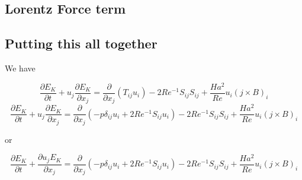 \documentclass[11pt]{article}
\newcommand{\PD}{\partial}
\begin{document}
\subsection{Lorentz Force term}

\subsection{Putting this all together}
We have

\begin{equation}
	\frac{\PD E_K}{\PD t}
	+
	u_j \frac{\PD E_K}{\PD x_j}
	= 
	\frac{\PD}{\PD x_j} (T_{ij} u_i)
	-
	2 Re^{-1} S_{ij} S_{ij}
	+
	\frac{Ha^2}{Re}
	u_i
	(j \times B)_i
\end{equation}
\begin{equation}
	\boxed{
	\frac{\PD E_K}{\PD t}
	+
	u_j \frac{\PD E_K}{\PD x_j}
	= 
	\frac{\PD}{\PD x_j} 
	(
	-p \delta_{ij}
	u_i
	+
	2 Re^{-1}
	S_{ij}
	u_i
	)
	-
	2 Re^{-1} S_{ij} S_{ij}
	+
	\frac{Ha^2}{Re}
	u_i
	(j \times B)_i
	}
\end{equation}

or

\begin{equation}
	\boxed{
	\frac{\PD E_K}{\PD t}
	+
	\frac{\PD u_j E_K}{\PD x_j}
	= 
	\frac{\PD}{\PD x_j} 
	(
	-p \delta_{ij}
	u_i
	+
	2 Re^{-1}
	S_{ij}
	u_i
	)
	-
	2 Re^{-1} S_{ij} S_{ij}
	+
	\frac{Ha^2}{Re}
	u_i
	(j \times B)_i
	}
\end{equation}
\end{document}
